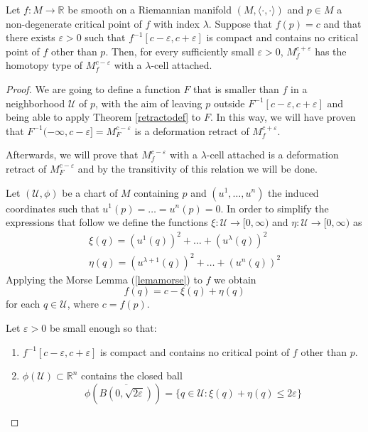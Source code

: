 \begin{theorem}
\label{pegadocelula}
     Let $f:M\to\mathbb{R}$ be smooth on a Riemannian manifold $(M,\langle\cdot,\cdot\rangle)$ and $p\in M$ a non-degenerate critical point of $f$ with index $\lambda$. Suppose that $f(p)=c$ and that there exists $\varepsilon>0$ such that $f^{-1}[c-\varepsilon,c+\varepsilon]$ is compact and contains no critical point of $f$ other than $p$. Then, for every sufficiently small $\varepsilon>0$, $M^{c+\varepsilon}_f$ has the homotopy type of $M^{c-\varepsilon}_f$ with a $\lambda$-cell attached.
\end{theorem}

\begin{proof}
    We are going to define a function $F$ that is smaller than $f$ in a neighborhood $\mathcal{U}$ of $p$, with the aim of leaving $p$ outside $F^{-1}[c-\varepsilon, c+\varepsilon]$ and being able to apply Theorem \ref{retractodef} to $F$. In this way, we will have proven that $F^{-1}(-\infty,c-\varepsilon]=M^{c-\varepsilon}_F$ is a deformation retract of $M^{c+\varepsilon}_f$.

    Afterwards, we will prove that $M^{c-\varepsilon}_f$ with a $\lambda$-cell attached is a deformation retract of $M^{c-\varepsilon}_F$ and by the transitivity of this relation we will be done.

    \bigskip

    Let $(\mathcal{U}, \phi)$ be a chart of $M$ containing $p$ and $(u^1,\dots , u^n)$ the induced coordinates such that $u^1(p)=\dots=u^{n}(p)=0$. In order to simplify the expressions that follow we define the functions $\xi:\mathcal{U}\to [0,\infty)$ and $\eta:\mathcal{U}\to [0,\infty)$ as
    \begin{gather*}
        \xi(q)=(u^1(q))^2+\dots +(u^{\lambda}(q))^2\\
        \eta(q)=(u^{\lambda +1}(q))^2+\dots +(u^{n}(q))^2
    \end{gather*}
    Applying the Morse Lemma (\ref{lemamorse}) to $f$ we obtain
    \begin{equation*}
        f(q) = c - \xi(q) + \eta(q)
    \end{equation*}
    for each $q\in \mathcal{U}$, where $c=f(p).$

    Let $\varepsilon>0$ be small enough so that:
    \begin{enumerate}[label=\roman*)]
        \item $f^{-1}[c-\varepsilon,c+\varepsilon]$ is compact and contains no critical point of $f$ other than $p$.
        \item $\phi(\mathcal{U})\subset \mathbb{R}^n$ contains the closed ball
        \begin{equation*}
            \phi\left(\overline{B(0, \sqrt{2\varepsilon})}\right)= \{q\in \mathcal{U}: \xi(q)+\eta(q)\le 2\varepsilon\}
        \end{equation*}
    \end{enumerate}


\end{proof}

